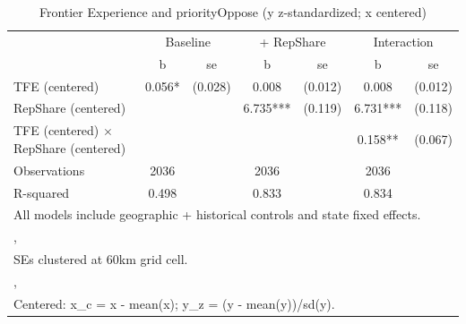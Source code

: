 \begin{table}[htbp]\centering
\def\sym#1{\ifmmode^{#1}\else\(^{#1}\)\fi}
\caption{Frontier Experience and priorityOppose (y z-standardized; x centered)}
\begin{tabular}{l*{3}{cc}}
\toprule
                &\multicolumn{2}{c}{Baseline}&\multicolumn{2}{c}{ + RepShare}&\multicolumn{2}{c}{Interaction}\\
                &        b   &       se&        b   &       se&        b   &       se\\
\midrule
TFE (centered)  &    0.056*  &  (0.028)&    0.008   &  (0.012)&    0.008   &  (0.012)\\
RepShare (centered)&            &         &    6.735***&  (0.119)&    6.731***&  (0.118)\\
TFE (centered) $\times$ RepShare (centered)&            &         &            &         &    0.158** &  (0.067)\\
\midrule
Observations    &     2036   &         &     2036   &         &     2036   &         \\
R-squared       &    0.498   &         &    0.833   &         &    0.834   &         \\
\bottomrule
\multicolumn{7}{l}{\footnotesize All models include geographic + historical controls and state fixed effects.}\\
\multicolumn{7}{l}{\footnotesize ,}\\
\multicolumn{7}{l}{\footnotesize SEs clustered at 60km grid cell.}\\
\multicolumn{7}{l}{\footnotesize ,}\\
\multicolumn{7}{l}{\footnotesize Centered: x\_c = x - mean(x); y\_z = (y - mean(y))/sd(y).}\\
\end{tabular}
\end{table}
